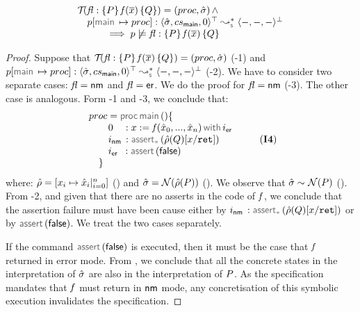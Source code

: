  
 \begin{temax}
$$
\begin{array}{l}
\testify{}(\specsig{\pass}{\pid(\jvec{x})}{\qass}{\flag})  = (\proc, \sstate) \, \wedge \\
\quad
  \prog[\jsilmain \mapsto \proc] :  \transabssemrule{\sstate, \csmain, 0}{-, -, -}{\top}{\bot}{\symbolic} \\ \quad \qquad 
    \implies  
         \prog \not\satisfies \specsig{\pass}{\pid(\jvec{x})}{\qass}{\flag}
\end{array}
$$
\end{temax}
 \begin{proof}
 Suppose that $\mathcal{T}_{}({\mathit{fl}} : \{ P \} \, \mathit{f}(\overline{x}) \, \{ Q \})  = (proc, \hat{\sigma})$ (\hyp{1}) 
 and $\prog[\jsilmain \mapsto \proc] :  \transabssemrule{\sstate, \csmain, 0}{-, -, -}{\top}{\bot}{\symbolic}$ (\hyp{2}). 
 We have to consider two separate cases: $\mathit{fl} = {\sf nm}$ and $\mathit{fl} = {\sf er}$. 
We do the proof for $\mathit{fl} = {\sf nm}$ (\hyp{3}). The other case is analogous. 
Form \hyp{1} and \hyp{3}, we conclude that: 
$$
\begin{array}{l}
\proc = \darkmath{\sf proc} \jsilmain () \{ \\ 
\qquad 0_{\phantom{\sf nm}}: \jsilcall{\jvar}{\pid}{\svar_0, ..., \svar_n}{\errlab} \\ 
 \qquad \retlab \, : \sepassert(\sstore(Q)[\jvar/\retvar])  \\
 \qquad \errlab \, \, \, : \jassert(\jfalse)   \\
\quad \}  
\end{array} 
\qquad \text{ (\ieq{4})}
$$
where: $\hat\rho =  [ x_i \mapsto \hat{x}_i|_{i=0}^n]$ () and $\hat{\sigma} = \mathcal{N}(\hat\rho(P))$ (). 
%
We observe that $\hat{\sigma} \sim_{} \mathcal{N}(P)$ (). 
%
From \hyp{2}, and given that there are no asserts in the code of $\mathit{f}$, we conclude that the assertion failure must have been 
cause either by $\retlab \, : \sepassert(\sstore(Q)[\jvar/\retvar])$ or by $\jassert(\jfalse)$. We treat the two cases separately. 
\vspace{3pt}

\noindent {} If the command $\jassert(\jfalse)$ is executed, then it must be the case that 
$\mathit{f}$ returned in error mode. From , we conclude that all the concrete states in the interpretation of 
$\hat{\sigma}$ are also in the interpretation of $P$. As the specification mandates that $\mathit{f}$ must return in 
${\sf nm}$ mode, any concretisation of this symbolic execution invalidates the specification. 
\vspace{5pt}


\end{proof}

